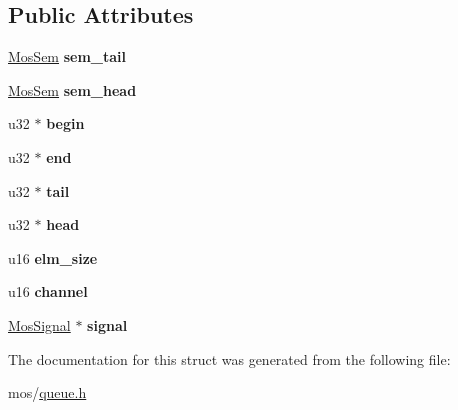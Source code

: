 \subsection*{Public Attributes}
\begin{DoxyCompactItemize}
\item 
\mbox{\label{structMosQueue_a5335ad626efa53590597eeebd06693cb}} 
\hyperlink{structMosSem}{Mos\+Sem} {\bfseries sem\+\_\+tail}
\item 
\mbox{\label{structMosQueue_a749f2e4ee9267fb52c4c6d9ebb213f87}} 
\hyperlink{structMosSem}{Mos\+Sem} {\bfseries sem\+\_\+head}
\item 
\mbox{\label{structMosQueue_a2d916f7452ac6b3417107a3168b6601b}} 
u32 $\ast$ {\bfseries begin}
\item 
\mbox{\label{structMosQueue_a6c5ec3ac8871d597e6e4b65768398781}} 
u32 $\ast$ {\bfseries end}
\item 
\mbox{\label{structMosQueue_a7c0a5b7c5060f6c4fe036ecf9180775e}} 
u32 $\ast$ {\bfseries tail}
\item 
\mbox{\label{structMosQueue_aa722b5e1355f585373da2319f35b3911}} 
u32 $\ast$ {\bfseries head}
\item 
\mbox{\label{structMosQueue_a33fd7b13bda2f199262b6dff3ad1158e}} 
u16 {\bfseries elm\+\_\+size}
\item 
\mbox{\label{structMosQueue_aaedec79b2bf30f2122e717c968870776}} 
u16 {\bfseries channel}
\item 
\mbox{\label{structMosQueue_ae7b9ae53f14ccb1987ac8be6bd3ef493}} 
\hyperlink{structMosSem}{Mos\+Signal} $\ast$ {\bfseries signal}
\end{DoxyCompactItemize}


The documentation for this struct was generated from the following file\+:\begin{DoxyCompactItemize}
\item 
mos/\hyperlink{queue_8h}{queue.\+h}\end{DoxyCompactItemize}
